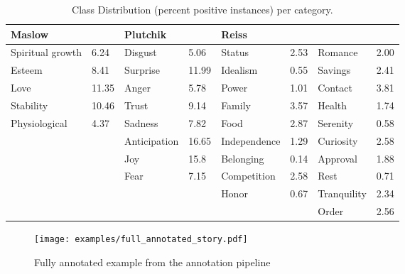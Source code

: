 \documentclass[11pt,a4paper]{article}
\begin{document}
\begin{table*}[tb]
\centering
\begin{tabular}{ll|ll|llll}
Maslow &  & Plutchik &  & Reiss &  &  &  \\ \hline
Spiritual growth & 6.24 & Disgust & 5.06 & Status & 2.53 & Romance & 2.00 \\
Esteem & 8.41 & Surprise & 11.99 & Idealism & 0.55 & Savings & 2.41 \\
Love & 11.35 & Anger & 5.78 & Power & 1.01 & Contact & 3.81 \\
Stability & 10.46 & Trust & 9.14 & Family & 3.57 & Health & 1.74 \\
Physiological & 4.37 & Sadness & 7.82 & Food & 2.87 & Serenity & 0.58 \\
 &  & Anticipation & 16.65 & Independence & 1.29 & Curiosity & 2.58 \\
 &  & Joy & 15.8 & Belonging & 0.14 & Approval & 1.88 \\
 &  & Fear & 7.15 & Competition & 2.58 & Rest & 0.71 \\
 &  &  &  & Honor & 0.67 & Tranquility & 2.34 \\
 &  &  &  &  &  & Order & 2.56
\end{tabular}

\caption{Class Distribution (percent positive instances) per category.}
\label{tab:classdistrib}
\end{table*}

\begin{figure*}[tb]
    \centering
    \texttt{[image: examples/full\_annotated\_story.pdf]}
    \caption{Fully annotated example from the annotation pipeline}
    \label{fig:appx:FullEx}
\end{figure*}
 
\end{document}
